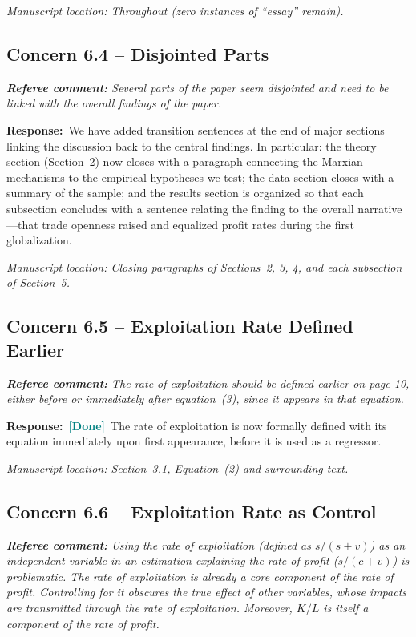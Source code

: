 \documentclass[11pt]{article}
\newcommand{\RC}[1]{\begin{refereebox}\textit{\textbf{Referee comment:} #1}\end{refereebox}}
\newcommand{\AR}{\noindent\textbf{Response:}\ }
\newcommand{\done}{\textcolor{teal}{\textbf{[Done]}}}
\begin{document}
\smallskip\noindent\textit{Manuscript location: Throughout (zero instances of ``essay'' remain).}

\subsection*{Concern 6.4 -- Disjointed Parts}

\RC{Several parts of the paper seem disjointed and need to be linked with the overall findings of the paper.}

\AR We have added transition sentences at the end of major sections linking the discussion back to the central findings. In particular: the theory section (Section~2) now closes with a paragraph connecting the Marxian mechanisms to the empirical hypotheses we test; the data section closes with a summary of the sample; and the results section is organized so that each subsection concludes with a sentence relating the finding to the overall narrative---that trade openness raised and equalized profit rates during the first globalization.

\smallskip\noindent\textit{Manuscript location: Closing paragraphs of Sections~2, 3, 4, and each subsection of Section~5.}

\subsection*{Concern 6.5 -- Exploitation Rate Defined Earlier}

\RC{The rate of exploitation should be defined earlier on page 10, either before or immediately after equation~(3), since it appears in that equation.}

\AR \done\ The rate of exploitation is now formally defined with its equation immediately upon first appearance, before it is used as a regressor.

\smallskip\noindent\textit{Manuscript location: Section~3.1, Equation~(2) and surrounding text.}

\subsection*{Concern 6.6 -- Exploitation Rate as Control}

\RC{Using the rate of exploitation (defined as $s/(s+v)$) as an independent variable in an estimation explaining the rate of profit ($s/(c+v)$) is problematic. The rate of exploitation is already a core component of the rate of profit. Controlling for it obscures the true effect of other variables, whose impacts are transmitted through the rate of exploitation. Moreover, $K/L$ is itself a component of the rate of profit.}
\end{document}
